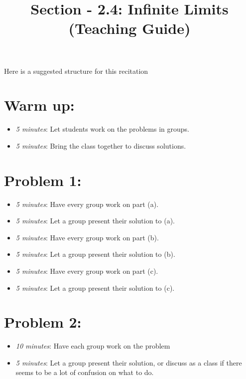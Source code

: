 \documentclass[handout,nooutcomes]{ximera}
\title{Section - 2.4:  Infinite Limits (Teaching Guide)}
\begin{document}
\begin{abstract}		\end{abstract}
\maketitle

Here is a suggested structure for this recitation

\section*{Warm up:} 

	\begin{itemize}
	
	\item  \emph{5 minutes}:  Let students work on the problems in groups.
	
	\item  \emph{5 minutes}:   Bring the class together to discuss solutions.
	
	\end{itemize}


\section*{Problem 1:}

	\begin{itemize}
	
	\item  \emph{5 minutes}:  Have every group work on part (a).
	
	\item  \emph{5 minutes}:  Let a group present their solution to (a).
	
	\item  \emph{5 minutes}:  Have every group work on part (b).
	
	\item  \emph{5 minutes}:  Let a group present their solution to (b).
	
	\item  \emph{5 minutes}:  Have every group work on part (c).
	
	\item  \emph{5 minutes}:  Let a group present their solution to (c).
		
	\end{itemize}
	
	
	
\section*{Problem 2:}

	\begin{itemize}
	
	\item  \emph{10 minutes}:  Have each group work on the problem
	
	\item  \emph{5 minutes}:  Let a group present their solution, or discuss as a class if there seems to be a lot of confusion on what to do.
	
	\end{itemize}
	
	
	

	
	
	
\end{document}
